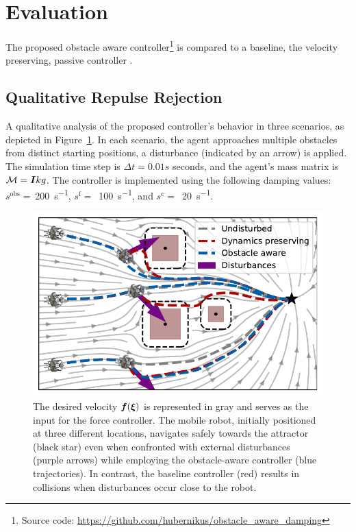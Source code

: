 \section{Evaluation}  \label{sec:evaluation} 
The proposed obstacle aware controller\footnote{Source code: \url{https://github.com/hubernikus/obstacle_aware_damping}} is compared to a baseline, the velocity preserving, passive controller \parencite{kronander2015passive}.

\subsection{Qualitative Repulse Rejection} \label{sec:qual_comp}
A qualitative analysis of the proposed controller's behavior in three scenarios, as depicted in Figure~\ref{fig:obstacle_aware_damping_comparison}. In each scenario, the agent approaches multiple obstacles from distinct starting positions, a disturbance (indicated by an arrow) is applied. The simulation time step is $\Delta t = 0.01 s$ seconds, and the agent's mass matrix is $\mathcal{M} = \boldsymbol{I} kg$. The controller is implemented using the following damping values:
$s^{\mathrm{obs}}=~$\qty{200}{s^{-1}},
$s^{\mathrm{f}}=$~\qty{100}{s^{-1}}, and
$s^{\mathrm{c}}=$~\qty{20}{s^{-1}}.

\begin{figure}[htbp]
  \centering
  \centerline{\includegraphics[width=0.95\columnwidth]{figures/multi_obstacle_with_damping.pdf}}
  \caption{
  The desired velocity $\boldsymbol{f}(\boldsymbol{\xi})$ is represented in gray and serves as the input for the force controller. The mobile robot, initially positioned at three different locations, navigates safely towards the attractor (black star) even when confronted with external disturbances (purple arrows) while employing the obstacle-aware controller (blue trajectories). In contrast, the baseline controller (red) results in collisions when disturbances occur close to the robot.
  }
  \label{fig:obstacle_aware_damping_comparison}
\end{figure}

